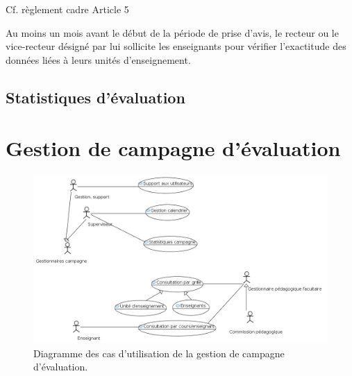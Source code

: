 \documentclass[a4paper,11pt]{report}
\begin{document}
Cf. règlement cadre Article 5

Au moins un mois avant le début de la période de prise d'avis, le recteur ou le vice-recteur désigné par lui sollicite les enseignants pour vérifier l'exactitude des données liées à leurs unités d'enseignement.






\subsection{Statistiques d'évaluation}


















\newpage
\section{Gestion de campagne d'évaluation}

\begin{figure}[ht]
\includegraphics[width=\linewidth]{workspace/evalens-usecases/gestion_campagne.png}
\caption{Diagramme des cas d'utilisation de la gestion de campagne d'évaluation.}
\label{fig:usecase-campagne}
\end{figure}


\end{document}

